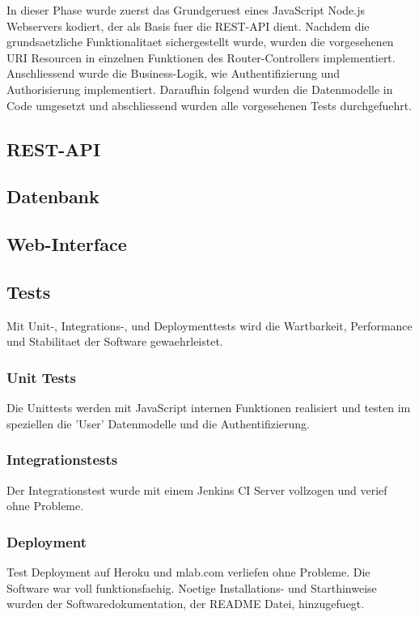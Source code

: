 In dieser Phase wurde zuerst das Grundgeruest eines JavaScript Node.js
Webservers kodiert, der als Basis fuer die REST-API dient. Nachdem die
grundsaetzliche Funktionalitaet sichergestellt wurde, wurden die vorgesehenen
URI Resourcen in einzelnen Funktionen des Router-Controllers implementiert.
Anschliessend wurde die Business-Logik, wie Authentifizierung und Authorisierung
implementiert. Daraufhin folgend wurden die Datenmodelle in Code umgesetzt und
abschliessend wurden alle vorgesehenen Tests durchgefuehrt.

\subsection{REST-API}
  \blindtext

\subsection{Datenbank}
  \blindtext

\subsection{Web-Interface}
  \blindtext

\subsection{Tests}
Mit Unit-, Integrations-, und Deploymenttests wird die Wartbarkeit, Performance
und Stabilitaet der Software gewaehrleistet.

  \subsubsection{Unit Tests}
Die Unittests werden mit JavaScript internen Funktionen realisiert und testen
im speziellen die 'User' Datenmodelle und die Authentifizierung.

  \subsubsection{Integrationstests}
Der Integrationstest wurde mit einem Jenkins CI Server vollzogen und verief ohne
Probleme.

  \subsubsection{Deployment}
Test Deployment auf Heroku und mlab.com verliefen ohne Probleme. Die Software
war voll funktionsfaehig. Noetige Installations- und Starthinweise wurden der
Softwaredokumentation, der README Datei, hinzugefuegt.

